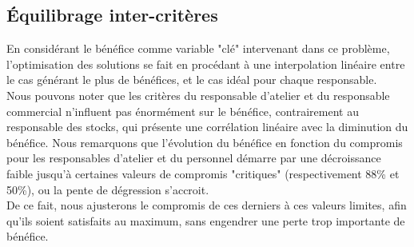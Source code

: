 \subsection{Équilibrage inter-critères}

En considérant le bénéfice comme variable "clé" intervenant dans ce problème,
l'optimisation des solutions se fait en procédant à une interpolation linéaire
entre le cas générant le plus de bénéfices, et le cas idéal pour chaque
responsable. \\


Nous pouvons noter que les critères du responsable d'atelier et du responsable
commercial n'influent pas énormément sur le bénéfice, contrairement au
responsable des stocks, qui présente une corrélation linéaire avec la
diminution du bénéfice.
Nous remarquons que l'évolution du bénéfice en fonction du compromis pour les
responsables d'atelier et du personnel démarre par une décroissance faible
jusqu'à certaines valeurs de compromis "critiques" (respectivement 88\% et
50\%), ou la pente de dégression s'accroit. \\

De ce fait, nous ajusterons le compromis de ces derniers à ces valeurs limites,
afin qu'ils soient satisfaits au maximum, sans engendrer une perte trop
importante de bénéfice. \\

